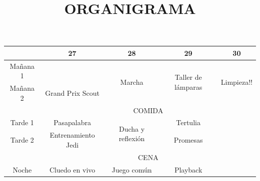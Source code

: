 \documentclass[72pt]{article}
\title{ORGANIGRAMA}
\date{}
\newlength{\w}
\begin{document}
\maketitle

\begin{center}\begin{tabular}{|c|c|c|c|c|}
    \hline
    \rowcolor{blue!50} \cellcolor{blue!10} & 27 & 28 & 29 & 30 \\
    \hline
    \cellcolor{yellow!50} Mañana 1 & \cellcolor{gray!80} & \multirow{2}{*}{Marcha} & 
    \multirow{2}{*}{Taller de lámparas} & \multirow{2}{*}{Limpieza!!} \\
    \cline{1-2}
    \cellcolor{yellow!50} Mañana 2 & Grand Prix Scout & & & \\
    \hline
    \cellcolor{yellow!50} & \multicolumn{4}{c|}{COMIDA} \\
    \hline
    \cellcolor{yellow!50} Tarde 1 & Pasapalabra & \multirow{2}{*}{Ducha y reflexión} &
    Tertulia & \cellcolor{gray!80} \\
    \cline{1-2} \cline{4-5}
    \cellcolor{yellow!50} Tarde 2 & Entrenamiento Jedi &  & Promesas  &
    \cellcolor{gray!80} \\
    \hline
    \cellcolor{yellow!50} & \multicolumn{4}{c|}{CENA} \\
    \hline
    \cellcolor{yellow!50} Noche & Cluedo en vivo & Juego común & Playback &
    \cellcolor{gray!80} \\
    \hline
\end{tabular}\end{center}
\end{document}
